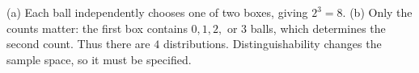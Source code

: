 (a) Each ball independently chooses one of two boxes, giving $2^3=\boxed8$. (b) Only the counts matter: the first box contains $0,1,2,$ or $3$ balls, which determines the second count. Thus there are $\boxed4$ distributions. Distinguishability changes the sample space, so it must be specified.
